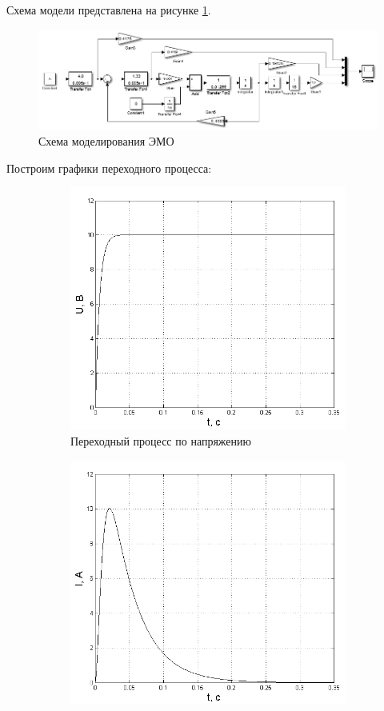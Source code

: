\documentclass[fleqn, a4paper, 11pt, russian]{article}
\begin{document}
	Схема модели представлена на рисунке \ref{fullModel}.
	\begin{figure}[ht!]
		\centering
		\includegraphics[width = \textwidth]{fullModel}
		\caption{Схема моделирования ЭМО}
		\label{fullModel}
	\end{figure}
	\newpage
	Построим графики переходного процесса:
	\begin{figure}[ht!]
		\centering
		\begin{subfigure}[b]{0.48\textwidth}
			\includegraphics[width = \textwidth]{M0U}
			\caption{Переходный процесс по напряжению}
		\end{subfigure}
		\hfill
		\begin{subfigure}[b]{0.48\textwidth}
			\includegraphics[width = \textwidth]{M0I}

\end{subfigure}
\end{figure}
\end{document}
